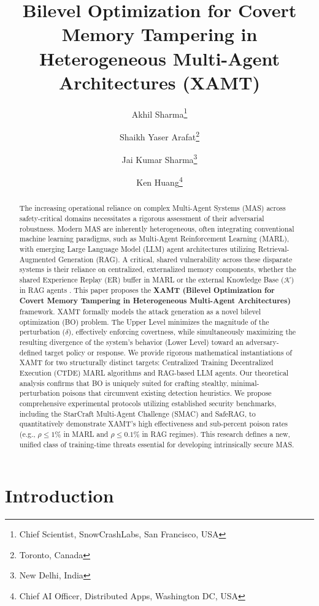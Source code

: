 \documentclass[conference]{IEEEtran}
\title{\textbf{Bilevel Optimization for Covert Memory Tampering in Heterogeneous Multi-Agent Architectures (XAMT)}}
\author{%
  Akhil Sharma\thanks{Chief Scientist, SnowCrashLabs, San Francisco, USA}%
  \and
  Shaikh Yaser Arafat\thanks{Toronto, Canada}%
  \and
  Jai Kumar Sharma\thanks{New Delhi, India}%
  \and
  Ken Huang\thanks{Chief AI Officer, Distributed Apps, Washington DC, USA}%
}
\date{}
\begin{document}
\maketitle

\begin{abstract}
The increasing operational reliance on complex Multi-Agent Systems (MAS) across safety-critical domains necessitates a rigorous assessment of their adversarial robustness. Modern MAS are inherently heterogeneous, often integrating conventional machine learning paradigms, such as Multi-Agent Reinforcement Learning (MARL), with emerging Large Language Model (LLM) agent architectures utilizing Retrieval-Augmented Generation (RAG). A critical, shared vulnerability across these disparate systems is their reliance on centralized, externalized memory components, whether the shared Experience Replay (ER) buffer in MARL or the external Knowledge Base ($\mathcal{K}$) in RAG agents \cite{Ref1, Ref2}. This paper proposes the \textbf{XAMT (Bilevel Optimization for Covert Memory Tampering in Heterogeneous Multi-Agent Architectures)} framework. XAMT formally models the attack generation as a novel bilevel optimization (BO) problem. The Upper Level minimizes the magnitude of the perturbation ($\delta$), effectively enforcing covertness, while simultaneously maximizing the resulting divergence of the system's behavior (Lower Level) toward an adversary-defined target policy or response. We provide rigorous mathematical instantiations of XAMT for two structurally distinct targets: Centralized Training Decentralized Execution (CTDE) MARL algorithms and RAG-based LLM agents. Our theoretical analysis confirms that BO is uniquely suited for crafting stealthy, minimal-perturbation poisons that circumvent existing detection heuristics. We propose comprehensive experimental protocols utilizing established security benchmarks, including the StarCraft Multi-Agent Challenge (SMAC) and SafeRAG, to quantitatively demonstrate XAMT's high effectiveness and sub-percent poison rates (e.g., $\rho \le 1\%$ in MARL and $\rho \le 0.1\%$ in RAG regimes). This research defines a new, unified class of training-time threats essential for developing intrinsically secure MAS.
\end{abstract}


\section{Introduction}
\end{document}
